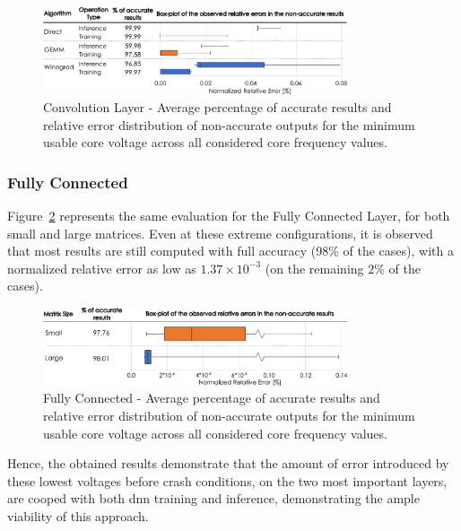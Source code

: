 \begin{figure}[htbp]
    \centering
        \includegraphics[width=0.8\textwidth]{Figures/Application To Deep Learning/Convolution_Error_Distribution.pdf}
        \caption{Convolution Layer - Average percentage of accurate results and relative error distribution of non-accurate outputs for the minimum usable core voltage across all considered core frequency values.}
    \label{fig:Convolution_errors}
\end{figure}



\subsubsection{Fully Connected}

Figure~\ref{fig:MatrixMult_errors} represents the same evaluation for the Fully Connected Layer, for both small and large matrices. Even at these extreme configurations, it is observed that most results are still computed with full accuracy (98\% of the cases), with a normalized relative error as low as $1.37\times10^{-3}$ (on the remaining $2$\% of the cases).

\begin{figure}[htbp]
    \centering
        \includegraphics[width=0.8\textwidth]{Figures/Application To Deep Learning/MatrixMul_Error_Distribution.pdf}
        \caption{Fully Connected - Average percentage of accurate results and relative error distribution of non-accurate outputs for the minimum usable core voltage across all considered core frequency values.}
    \label{fig:MatrixMult_errors}
\end{figure}

Hence, the obtained results demonstrate that the amount of error introduced by these lowest voltages before crash conditions, on the two most important layers, are cooped with both \acrshort{dnn} training and inference, demonstrating the ample viability of this approach.


